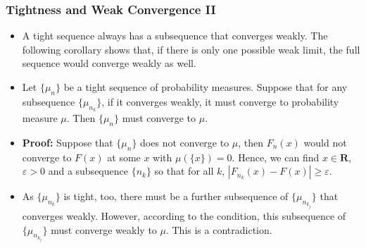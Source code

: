 \documentclass[handout]{beamer}
\begin{document}
   \frame
{
  \frametitle{Tightness and Weak Convergence II}

 \begin{itemize}

\item<1-> A tight sequence always has a subsequence that converges weakly. The following corollary shows that, if there is only one possible weak limit,  the full sequence would converge weakly as well. 
 \item<2->[] \begin{Corollary}[11.1.11]
 Let $\{\mu_n\}$ be a tight sequence of probability measures. Suppose that for any subsequence $\{\mu_{n_k}\}$, if it converges weakly, it must converge to probability measure $\mu$. Then $\{\mu_n\}$ must converge to $\mu$.
 \end{Corollary}
\item<3->\textbf{Proof:} Suppose that  $\{\mu_n\}$ does not converge to $\mu$, then $F_n(x)$ would not converge to $F(x)$  at some $x$ with $\mu(\{x\})=0$. Hence, we can find $x\in \mathbf{R}$, $\varepsilon>0$ and a subsequence $\{n_k\}$ so that for all $k$, $|F_{n_k} (x)-F(x)|\geq \varepsilon$.
\item<4->[-] As $\{\mu_{n_k}\}$ is tight, too, there must be a further subsequence of $\{\mu_{n_{k_j}}\}$ that converges weakly. However, according to the condition, this subsequence of $\{\mu_{n_{k_j}}\}$ must converge weakly to $\mu$. This is a contradiction.

\end{itemize}
 }
 
\end{document}
